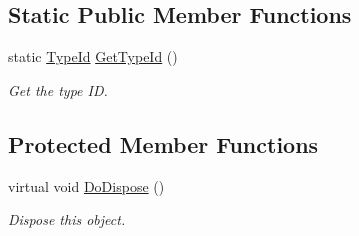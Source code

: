 \subsection*{Static Public Member Functions}
\begin{DoxyCompactItemize}
\item 
static \hyperlink{classns3_1_1TypeId}{Type\+Id} \hyperlink{classns3_1_1Ipv6Interface_a253372336ff6231ca72473923d117218}{Get\+Type\+Id} ()
\begin{DoxyCompactList}\small\item\em Get the type ID. \end{DoxyCompactList}\end{DoxyCompactItemize}
\subsection*{Protected Member Functions}
\begin{DoxyCompactItemize}
\item 
virtual void \hyperlink{classns3_1_1Ipv6Interface_a188e55d2aaee4028bb46fd68818c01f7}{Do\+Dispose} ()
\begin{DoxyCompactList}\small\item\em Dispose this object. \end{DoxyCompactList}\end{DoxyCompactItemize}
